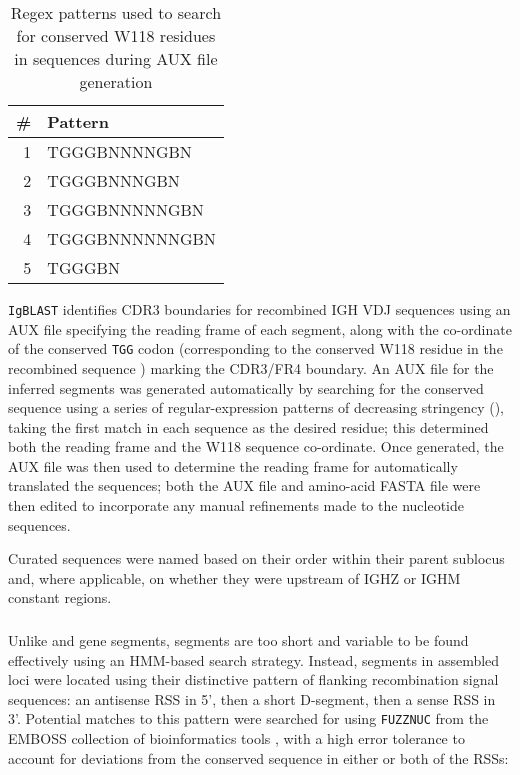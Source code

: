 \begin{wraptable}{r}{5.5cm}
\caption{Regex patterns used to search for conserved W118 residues in \jh sequences during AUX file generation}\label{tab:jh-aux-patterns}
\begin{tabular}{r>{\ttseries}l}\toprule  
\# & Pattern \\\midrule
1 & TGGGBNNNNGBN\\
2 & TGGGBNNNGBN\\
3 & TGGGBNNNNNGBN\\
4 & TGGGBNNNNNNGBN\\
5 & TGGGBN\\\bottomrule
\end{tabular}
\end{wraptable}

\lstinline{IgBLAST} \parencite{ye2013igblast} identifies CDR3 boundaries for recombined IGH VDJ sequences using an AUX file specifying the reading frame of each \jh segment, along with the co-ordinate of the conserved \texttt{TGG} codon (corresponding to the conserved W118 residue in the recombined sequence \parencite{lefranc2014immunoglobulins}) marking the CDR3/FR4 boundary. An AUX file for the inferred \jh segments was generated automatically by searching for the conserved sequence using a series of regular-expression patterns of decreasing stringency (), taking the first match in each sequence as the desired residue; this determined both the reading frame and the W118 sequence co-ordinate. Once generated, the AUX file was then used to determine the reading frame for automatically translated the \jh sequences; both the AUX file and amino-acid FASTA file were then edited to incorporate any manual refinements made to the \jh nucleotide sequences.

Curated \jh sequences were named based on their order within their parent sublocus and, where applicable, on whether they were upstream of IGHZ or IGHM constant regions. 

\subsubsection{\dh}

Unlike \vh and \jh gene segments, \dh segments are too short and variable to be found effectively using an HMM-based search strategy. Instead, \dh segments in assembled loci were located using their distinctive pattern of flanking recombination signal sequences: an antisense RSS in 5', then a short D-segment, then a sense RSS in 3'. Potential matches to this pattern were searched for using \lstinline{FUZZNUC} from the EMBOSS collection of bioinformatics tools \parencite{rice2000emboss}, with a high error tolerance to account for deviations from the conserved sequence in either or both of the RSSs:

